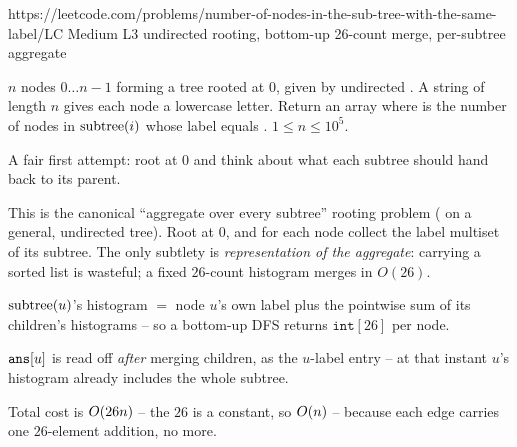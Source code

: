   {https://leetcode.com/problems/number-of-nodes-in-the-sub-tree-with-the-same-label/}{LC Medium L3}
  {undirected rooting, bottom-up 26-count merge, per-subtree aggregate}

\begin{problemstatement}
$n$ nodes $0\dots n-1$ forming a tree rooted at $0$, given by undirected . A
string  of length $n$ gives each node a lowercase letter. Return an array
 where  is the number of nodes in $\operatorname{subtree}(i)$ whose label equals
. $1 \le n \le 10^5$.
\end{problemstatement}

\begin{attemptgate}
A fair first attempt: root at $0$ and think about what each subtree should hand back to
its parent.
\end{attemptgate}

This is the canonical ``aggregate over every subtree'' rooting problem
( on a general, undirected tree). Root at $0$, and for each node
collect the label multiset of its subtree. The only subtlety is \emph{representation of the
aggregate}: carrying a sorted list is wasteful; a fixed $26$-count histogram merges in
$O(26)$.

\begin{observation}
$\operatorname{subtree}(u)$'s histogram $=$ node $u$'s own label plus the pointwise sum of its children's
histograms -- so a bottom-up DFS returns $\texttt{int}[26]$ per node.
\end{observation}
\begin{observation}
$\texttt{ans}[u]$ is read off \emph{after} merging children, as the $u$-label entry -- at that
instant $u$'s histogram already includes the whole subtree.
\end{observation}
\begin{observation}
Total cost is $O(26n)$ -- the $26$ is a constant, so $O(n)$ -- because each edge
carries one $26$-element addition, no more.
\end{observation}

